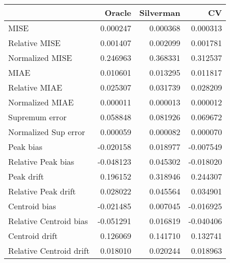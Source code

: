 \begin{tabular}{lrrr}
  \toprule
 & Oracle & Silverman & CV \\ 
  \midrule
MISE & 0.000247 & 0.000368 & 0.000313 \\ 
  Relative MISE & 0.001407 & 0.002099 & 0.001781 \\ 
  Normalized MISE & 0.246963 & 0.368331 & 0.312537 \\ 
  MIAE & 0.010601 & 0.013295 & 0.011817 \\ 
  Relative MIAE & 0.025307 & 0.031739 & 0.028209 \\ 
  Normalized MIAE & 0.000011 & 0.000013 & 0.000012 \\ 
  Supremum error & 0.058848 & 0.081926 & 0.069672 \\ 
  Normalized Sup error & 0.000059 & 0.000082 & 0.000070 \\ 
  Peak bias & -0.020158 & 0.018977 & -0.007549 \\ 
  Relative Peak bias & -0.048123 & 0.045302 & -0.018020 \\ 
  Peak drift & 0.196152 & 0.318946 & 0.244307 \\ 
  Relative Peak drift & 0.028022 & 0.045564 & 0.034901 \\ 
  Centroid bias & -0.021485 & 0.007045 & -0.016925 \\ 
  Relative Centroid bias & -0.051291 & 0.016819 & -0.040406 \\ 
  Centroid drift & 0.126069 & 0.141710 & 0.132741 \\ 
  Relative Centroid drift & 0.018010 & 0.020244 & 0.018963 \\ 
   \bottomrule
\end{tabular}
